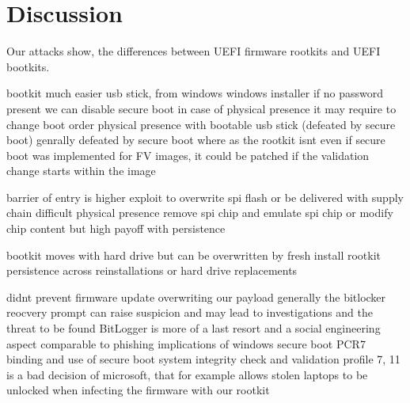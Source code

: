 


\chapter{Discussion}


Our attacks show, the differences between \ac{UEFI} firmware rootkits and \ac{UEFI} bootkits.


bootkit much easier
usb stick, from windows
windows installer
if no password present we can disable secure boot
in case of physical presence it may require to change boot order
physical presence with bootable usb stick (defeated by secure boot)
genrally defeated by secure boot where as the rootkit isnt
even if secure boot was implemented for FV images, it could be patched if the validation change starts within the image

barrier of entry is higher
exploit to overwrite spi flash or be delivered with supply chain difficult
physical presence remove spi chip and emulate spi chip or modify chip content
but high payoff with persistence

bootkit moves with hard drive but can be overwritten by fresh install
rootkit persistence across reinstallations or hard drive replacements



didnt prevent firmware update overwriting our payload
generally the bitlocker reocvery prompt can raise suspicion and may lead to investigations and the threat to be found
BitLogger is more of a last resort and a social engineering aspect comparable to phishing
implications of windows secure boot PCR7 binding and use of secure boot system integrity check and validation profile 7, 11 is a bad decision of microsoft, that for example allows
stolen laptops to be unlocked when infecting the firmware with our rootkit


